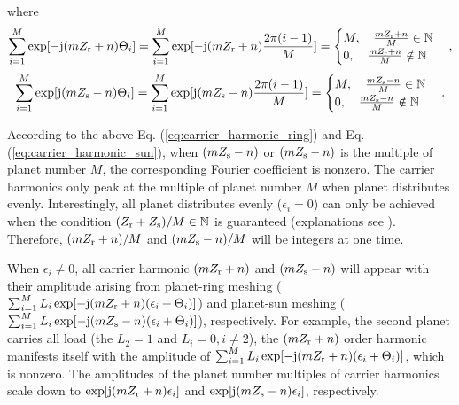 \documentclass[a4paper,fleqn]{cas-sc}%
\begin{document}
where
\begin{equation}
        \sum_{i=1}^{M} \exp[-{\rm j} (m Z_{\rm r} + n)\Theta_i]=\sum_{i=1}^{M} \exp[-{\rm j}(m Z_{\rm r}+n)\frac{2 \pi (i-1)}{M}]=\begin{cases}
            M, \quad \frac{m Z_{\rm r}+n}{M} \in \mathbb{N}\\
            0, \quad \frac{m Z_{\rm r}+n}{M} \notin \mathbb{N}
        \end{cases},\label{eq:carrier_harmonic_ring}
\end{equation}
\begin{equation}
    \sum_{i=1}^{M} \exp[{\rm j} (m Z_{\rm s} - n)\Theta_i]=\sum_{i=1}^{M} \exp[{\rm j}(m Z_{\rm s}-n)\frac{2 \pi (i-1)}{M}]=\begin{cases}
         M, \quad \frac{m Z_{\rm s}-n}{M} \in \mathbb{N}\\
        0, \quad \frac{m Z_{\rm s}-n}{M} \notin \mathbb{N}
    \end{cases}.\label{eq:carrier_harmonic_sun}
\end{equation}
\par According to the above Eq. (\ref{eq:carrier_harmonic_ring}) and Eq. (\ref{eq:carrier_harmonic_sun}), when $(m Z_{\rm s}-n)$ or $(m Z_{\rm s}-n)$ is the multiple of planet number $M$, the corresponding Fourier coefficient is nonzero. The carrier harmonics only peak at the multiple of planet number $M$ when planet distributes evenly. Interestingly, all planet distributes evenly ($\epsilon_i=0$) can only be achieved when the condition $(Z_{\rm r}+Z_{\rm s})/M \in \mathbb{N}$ is guaranteed (explanations see ). Therefore, $(m Z_{\rm r}+n)/M$ and $(m Z_{\rm s}-n)/M$ will be integers at one time. 
\par When $\epsilon_i \neq 0$, all carrier harmonic $(m Z_{\rm r} + n)$ and $(m Z_{\rm s} - n)$ will appear with their amplitude arising from planet-ring meshing ($\sum_{i=1}^{M} L_i \exp[-{\rm j} (m Z_{\rm r} + n)(\epsilon_i+\Theta_i)]$) and planet-sun meshing ($\sum_{i=1}^{M} L_i \exp[-{\rm j} (m Z_{\rm s} - n)(\epsilon_i+\Theta_i)]$), respectively. For example, the second planet carries all load (the $L_2=1$ and $L_i=0,i\neq2$), the $(m Z_{\rm r} + n)$ order harmonic manifests itself with the amplitude of $\sum_{i=1}^{M} L_i \exp[-{\rm j} (m Z_{\rm r} + n)(\epsilon_i+\Theta_i)]$, which is nonzero. The amplitudes of the planet number multiples of carrier harmonics scale down to $\exp[{\rm j}(m Z_{\rm r}+n)\epsilon_i]$ and $\exp[{\rm j}(m Z_{\rm s}-n)\epsilon_i]$, respectively.
\end{document}
